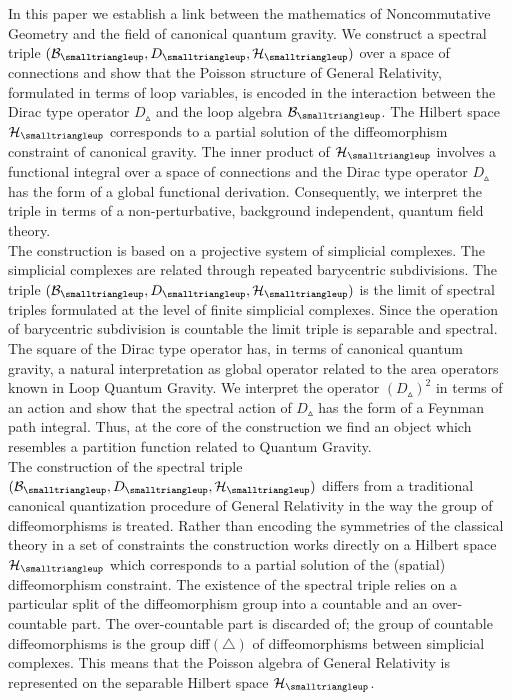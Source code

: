 \documentclass[12pt]{article}
\def\cb{{\cal B}}
\def\ch{{\cal H}}
\begin{document}
In this paper we establish a link between the mathematics of Noncommutative Geometry and the field of canonical quantum gravity. We construct a spectral triple $(\cb_{\smalltriangleup},D_{\smalltriangleup},\ch_\smalltriangleup)$ over a space of connections and show that the Poisson structure of General Relativity, formulated in terms of loop variables, is encoded in the interaction between the Dirac type operator $D_{\smalltriangleup}$ and the loop algebra $\cb_{\smalltriangleup}$. The Hilbert space $\ch_\smalltriangleup$ corresponds to a partial solution of the diffeomorphism constraint of canonical gravity. The inner product of $\ch_\smalltriangleup$ involves a functional integral over a space of connections and the Dirac type operator $D_{\smalltriangleup}$ has the form of a global functional derivation. Consequently, we interpret the triple in terms of a non-perturbative, background independent, quantum field theory. \\

The construction is based on a projective system of simplicial complexes. The simplicial complexes are related through repeated barycentric subdivisions. The triple $(\cb_{\smalltriangleup},D_{\smalltriangleup},\ch_\smalltriangleup)$ is the limit of spectral triples formulated at the level of finite simplicial complexes. Since the operation of barycentric subdivision is countable the limit triple is separable and spectral.\\

The square of the Dirac type operator has, in terms of canonical quantum gravity, a natural interpretation as global  operator related to the area operators known in Loop Quantum Gravity. We interpret the operator $(D_{\smalltriangleup})^2$ in terms of an action and show that the spectral action of $D_{\smalltriangleup}$ has the form of a Feynman path integral. Thus, at the core of the construction we find an object which resembles a partition function related to Quantum Gravity.\\

The construction of the spectral triple $(\cb_{\smalltriangleup},D_{\smalltriangleup},\ch_\smalltriangleup)$ differs from a traditional canonical quantization procedure of General Relativity in the way the group of diffeomorphisms is treated. Rather than encoding the symmetries of the classical theory in a set of constraints the construction works directly on a Hilbert space $\ch_\smalltriangleup$ which corresponds to a partial solution of the (spatial) diffeomorphism constraint. The existence of the spectral triple relies on a particular split of the diffeomorphism group into a countable and an over-countable part. The over-countable part is discarded of; the group of countable diffeomorphisms is the group diff$(\triangle)$ of diffeomorphisms between simplicial complexes. This means that the Poisson algebra of General Relativity is represented on the separable Hilbert space $\ch_\smalltriangleup$.\\
\end{document}
